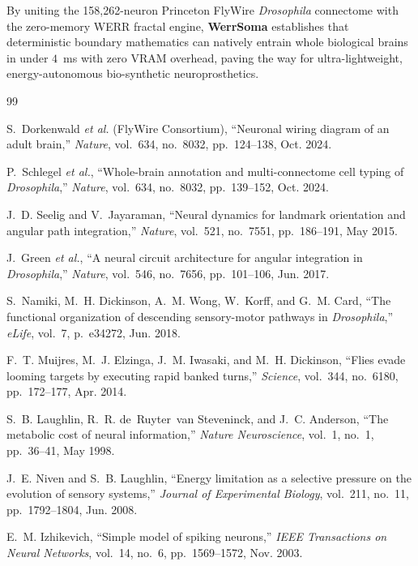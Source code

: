 \documentclass[10pt,twocolumn]{article}
\begin{document}
By uniting the 158,262-neuron Princeton FlyWire \textit{Drosophila} connectome with the zero-memory WERR fractal engine, \textbf{WerrSoma} establishes that deterministic boundary mathematics can natively entrain whole biological brains in under $4$~ms with zero VRAM overhead, paving the way for ultra-lightweight, energy-autonomous bio-synthetic neuroprosthetics.

\begin{thebibliography}{99}

S.~Dorkenwald \textit{et al.} (FlyWire Consortium), ``Neuronal wiring diagram of an adult brain,'' \textit{Nature}, vol.~634, no.~8032, pp.~124--138, Oct. 2024.

P.~Schlegel \textit{et al.}, ``Whole-brain annotation and multi-connectome cell typing of \textit{Drosophila},'' \textit{Nature}, vol.~634, no.~8032, pp.~139--152, Oct. 2024.

J.~D. Seelig and V.~Jayaraman, ``Neural dynamics for landmark orientation and angular path integration,'' \textit{Nature}, vol.~521, no.~7551, pp.~186--191, May 2015.

J.~Green \textit{et al.}, ``A neural circuit architecture for angular integration in \textit{Drosophila},'' \textit{Nature}, vol.~546, no.~7656, pp.~101--106, Jun. 2017.

S.~Namiki, M.~H. Dickinson, A.~M. Wong, W.~Korff, and G.~M. Card, ``The functional organization of descending sensory-motor pathways in \textit{Drosophila},'' \textit{eLife}, vol.~7, p.~e34272, Jun. 2018.

F.~T. Muijres, M.~J. Elzinga, J.~M. Iwasaki, and M.~H. Dickinson, ``Flies evade looming targets by executing rapid banked turns,'' \textit{Science}, vol.~344, no.~6180, pp.~172--177, Apr. 2014.

S.~B. Laughlin, R.~R. de~Ruyter~van Steveninck, and J.~C. Anderson, ``The metabolic cost of neural information,'' \textit{Nature Neuroscience}, vol.~1, no.~1, pp.~36--41, May 1998.

J.~E. Niven and S.~B. Laughlin, ``Energy limitation as a selective pressure on the evolution of sensory systems,'' \textit{Journal of Experimental Biology}, vol.~211, no.~11, pp.~1792--1804, Jun. 2008.

E.~M. Izhikevich, ``Simple model of spiking neurons,'' \textit{IEEE Transactions on Neural Networks}, vol.~14, no.~6, pp.~1569--1572, Nov. 2003.


\end{thebibliography}
\end{document}
